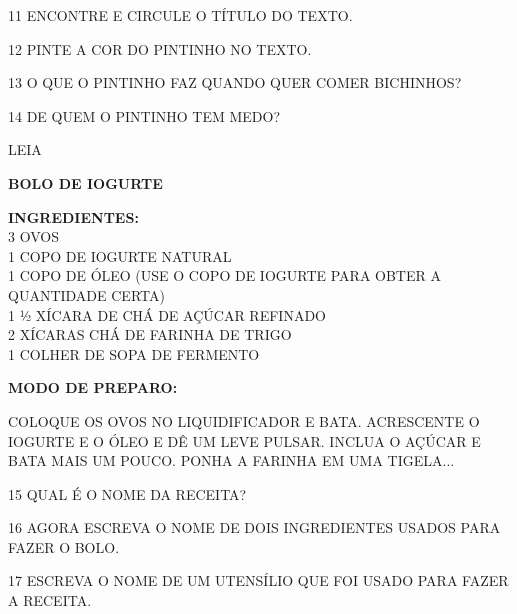 \begin{escola}


\num{11} ENCONTRE E CIRCULE O TÍTULO DO TEXTO.

\num{12} PINTE A COR DO PINTINHO NO TEXTO.

\num{13} O QUE O PINTINHO FAZ QUANDO QUER COMER BICHINHOS?


\num{14} DE QUEM O PINTINHO TEM MEDO?


LEIA


\textbf{BOLO DE IOGURTE}

\textbf{INGREDIENTES:}\\
3 OVOS\\
1 COPO DE IOGURTE NATURAL\\
1 COPO DE ÓLEO (USE O COPO DE IOGURTE PARA OBTER A QUANTIDADE CERTA)\\
1 ½ XÍCARA DE CHÁ DE AÇÚCAR REFINADO\\
2 XÍCARAS CHÁ DE FARINHA DE TRIGO\\
1 COLHER DE SOPA DE FERMENTO

\textbf{MODO DE PREPARO:}

COLOQUE OS OVOS NO LIQUIDIFICADOR E BATA. ACRESCENTE O IOGURTE E O ÓLEO
E DÊ UM LEVE PULSAR. INCLUA O AÇÚCAR E BATA MAIS UM POUCO. PONHA A
FARINHA EM UMA TIGELA...



\num{15} QUAL É O NOME DA RECEITA?


\num{16} AGORA ESCREVA O NOME DE DOIS INGREDIENTES USADOS PARA FAZER O BOLO.


\num{17} ESCREVA O NOME DE UM UTENSÍLIO QUE FOI USADO PARA FAZER A RECEITA.


\end{escola}
